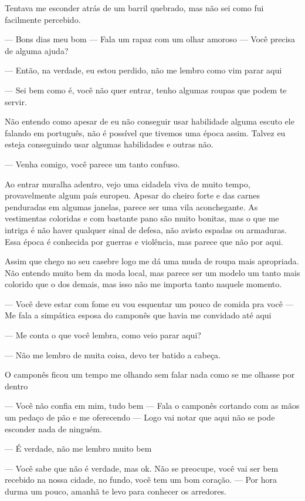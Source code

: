 Tentava me esconder atrás de um barril quebrado, mas não sei como fui facilmente percebido.

— Bons dias meu bom — Fala um rapaz com um olhar amoroso — Você precisa de alguma ajuda?

— Então, na verdade, eu estou perdido, não me lembro como vim parar aqui

— Sei bem como é, você não quer entrar, tenho algumas roupas que podem te servir.

Não entendo como apesar de eu não conseguir usar habilidade alguma escuto ele falando em português, não é possível que tivemos uma época assim. Talvez eu esteja conseguindo usar algumas habilidades e outras não.

— Venha comigo, você parece um tanto confuso.

Ao entrar muralha adentro, vejo uma cidadela viva de muito tempo, provavelmente algum país europeu. Apesar do cheiro forte e das carnes penduradas em algumas janelas, parece ser uma vila aconchegante. As vestimentas coloridas e com bastante pano são muito bonitas, mas o que me intriga é não haver qualquer sinal de defesa, não avisto espadas ou armaduras. Essa época é conhecida por guerras e violência, mas parece que não por aqui.

Assim que chego no seu casebre logo me dá uma muda de roupa mais apropriada. Não entendo muito bem da moda local, mas parece ser um modelo um tanto mais colorido que o dos demais, mas isso não me importa tanto naquele momento.

— Você deve estar com fome eu vou esquentar um pouco de comida pra você — Me fala a simpática esposa do camponês que havia me convidado até aqui

— Me conta o que você lembra, como veio parar aqui?

— Não me lembro de muita coisa, devo ter batido a cabeça.

O camponês ficou um tempo me olhando sem falar nada como se me olhasse por dentro

— Você não confia em mim, tudo bem — Fala o camponês cortando com as mãos um pedaço de pão e me oferecendo — Logo vai notar que aqui não se pode esconder nada de ninguém.

— É verdade, não me lembro muito bem

— Você sabe que não é verdade, mas ok. Não se preocupe, você vai ser bem recebido na nossa cidade, no fundo, você tem um bom coração. — Por hora durma um pouco, amanhã te levo para conhecer os arredores.

